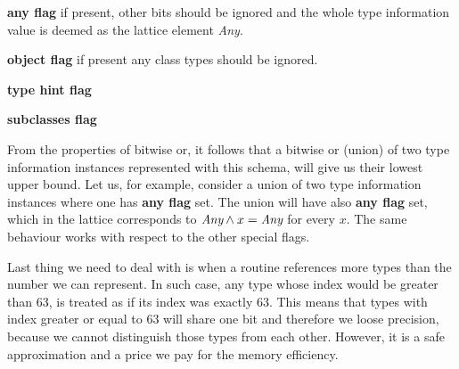         \begin{itemize*}
            \item\textbf{any flag} if present, other bits should be ignored and the whole 
                type information value is deemed as the lattice element \emph{Any}.            
            \item\textbf{object flag} if present any class types should be ignored.
            \item\textbf{type hint flag}
            \item\textbf{subclasses flag}
        \end{itemize*}
        
        From the properties of bitwise or, it follows that 
        a bitwise or (union) of two type information instances 
        represented with this schema, will give us their 
        lowest upper bound. Let us, for example, consider 
        a union of two type information instances where one 
        has \textbf{any flag} set. The union will have 
        also \textbf{any flag} set, which in the lattice 
        corresponds to $\emph{Any}\wedge{}x=\emph{Any}$ 
        for every $x$. The same behaviour works with 
        respect to the other special flags.
        
        Last thing we need to deal with is when a routine references 
        more types than the number we can represent. In such case, 
        any type whose index would be greater than $63$, is treated as 
        if its index was exactly $63$. This means that types with 
        index greater or equal to $63$ will share one bit and 
        therefore we loose precision, because we cannot distinguish those 
        types from each other. However, it is a safe approximation and 
        a price we pay for the memory efficiency.

